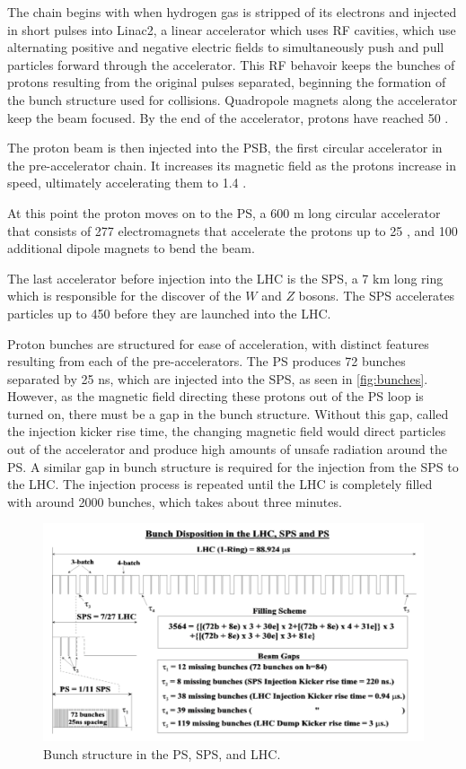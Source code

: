 The chain begins with when hydrogen gas is stripped of its electrons and injected in short pulses into Linac2, a linear accelerator which uses \ac{RF} cavities, which use alternating positive and negative electric fields to simultaneously push and pull particles forward through the accelerator. This \ac{RF} behavoir keeps the bunches of protons resulting from the original pulses separated, beginning the formation of the bunch structure used for collisions. Quadropole magnets along the accelerator keep the beam focused. By the end of the accelerator, protons have reached 50 \mev. 

The proton beam is then injected into the \ac{PSB}, the first circular accelerator in the pre-accelerator chain. It increases its magnetic field as the protons increase in speed, ultimately accelerating them to 1.4 \gev. 

At this point the proton moves on to the \ac{PS}, a 600 m long circular accelerator that consists of 277 electromagnets that accelerate the protons up to 25 \gev, and 100 additional dipole magnets to bend the beam. 

The last accelerator before injection into the \ac{LHC} is the \ac{SPS}, a 7 km long ring which is responsible for the discover of the $W$ and $Z$ bosons. The \ac{SPS} accelerates particles up to 450 \gev before they are launched into the \ac{LHC}. 

Proton bunches are structured for ease of acceleration, with distinct features resulting from each of the pre-accelerators. The \ac{PS} produces 72 bunches separated by 25 ns, which are injected into the \ac{SPS}, as seen in \autoref{fig:bunches}. However, as the magnetic field directing these protons out of the \ac{PS} loop is turned on, there must be a gap in the bunch structure. Without this gap, called the injection kicker rise time, the changing magnetic field would direct particles out of the accelerator and produce high amounts of unsafe radiation around the \ac{PS}. A similar gap in bunch structure is required for the injection from the \ac{SPS} to the \ac{LHC}. The injection process is repeated until the \ac{LHC} is completely filled with around 2000 bunches, which takes about three minutes.

\begin{centering}
\begin{figure}[!hbt]
\myfloatalign
\includegraphics[width=.90\linewidth]{figures/lhc/bunch_structure.png}
\caption{Bunch structure in the \ac{PS}, \ac{SPS}, and \ac{LHC}.}
\label{fig:bunches}
\end{figure}
\end{centering}


